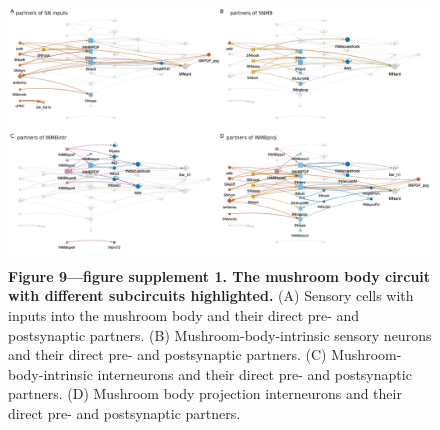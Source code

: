 \documentclass[
  11pt,
]{article}
\begin{document}
\begin{figure}[H]

{\centering \includegraphics[width=1\textwidth,height=\textheight]{Figures/Figure9_fig_suppl1.png}

}

\caption{\textbf{Figure 9---figure supplement 1. The mushroom body
circuit with different subcircuits highlighted.} (A) Sensory cells with
inputs into the mushroom body and their direct pre- and postsynaptic
partners. (B) Mushroom-body-intrinsic sensory neurons and their direct
pre- and postsynaptic partners. (C) Mushroom-body-intrinsic interneurons
and their direct pre- and postsynaptic partners. (D) Mushroom body
projection interneurons and their direct pre- and postsynaptic
partners.}

\end{figure}%
\end{document}
